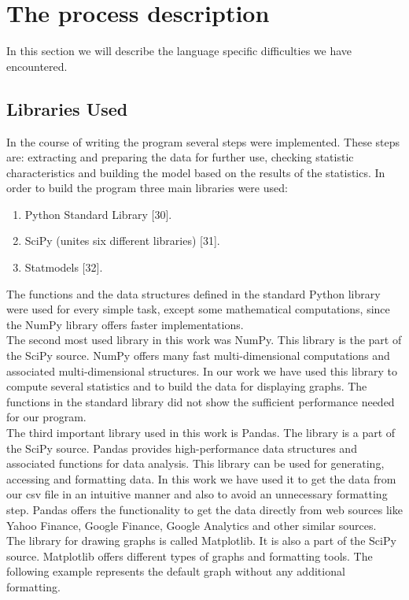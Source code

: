 \documentclass[
  twoside,
  11pt, a4paper,
  footinclude=true,
  headinclude=true,
  cleardoublepage=empty
]{scrreprt}
\begin{document}
    \section{The process description}
    In this section we will describe the language specific difficulties we have encountered.
    \subsection{Libraries Used}
    In the course of writing the program several steps were implemented. These steps are: extracting and preparing the data for further use, checking statistic characteristics and building the model based on the results of the statistics. In order to build the program three main libraries were used:
    \begin{enumerate}
        \item Python Standard Library [30].
        \item SciPy (unites six different libraries) [31].
        \item Statmodels [32].
    \end{enumerate}
    The functions and the data structures defined in the standard Python library were used for every simple task, except some mathematical computations, since the NumPy library offers faster implementations.\\
    The second most used library in this work was NumPy. This library is the part of the SciPy source. NumPy offers many fast multi-dimensional computations and associated multi-dimensional structures. In our work we have used this library to compute several statistics and to build the data for displaying graphs. The functions in the standard library did not show the sufficient performance needed for our program.\\
    The third important library used in this work is Pandas. The library is a part of the SciPy source. Pandas provides high-performance data structures and associated functions for data analysis. This library can be used for generating, accessing and formatting data. In this work we have used it to get the data from our csv file in an intuitive manner and also to avoid an unnecessary formatting step. Pandas offers the functionality to get the data directly from web sources like Yahoo Finance, Google Finance, Google Analytics and other similar sources.\\
    The library for drawing graphs is called Matplotlib. It is also a part of the SciPy source. Matplotlib offers different types of graphs and formatting tools. The following example represents the default graph without any additional formatting.
    
\end{document}
